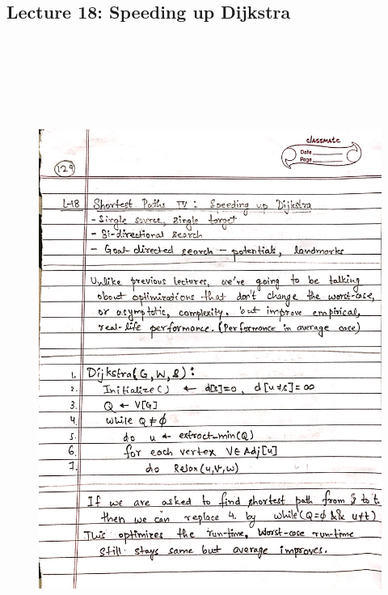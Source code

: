 \newpage
{\color{black} \subsection*{Lecture 18: Speeding up Dijkstra}}
\begin{figure}[H]
    \centering
    \includegraphics[width=16cm, height=21cm]{"./MIT-6.006/MIT-6006-129"}
\end{figure}

